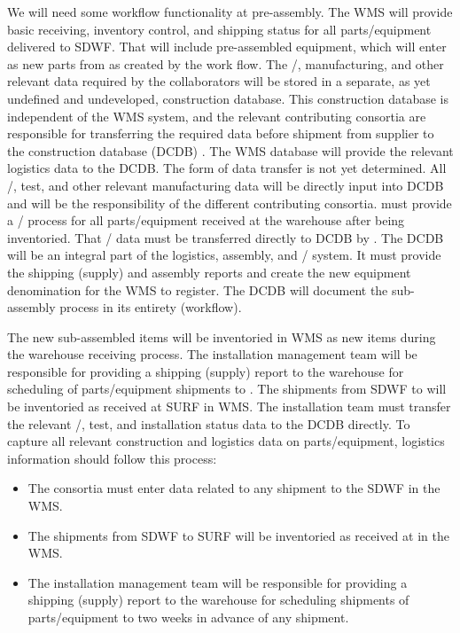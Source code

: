 We will need some workflow functionality at  pre-assembly.
The WMS will provide basic receiving, inventory control, and shipping status for all parts/equipment delivered to SDWF. That will include pre-assembled equipment, which will enter as new parts from  as created by the work flow.
The /, manufacturing, and other relevant data required by the  collaborators will be stored in a separate, as yet undefined and undeveloped,  construction database. 
This  construction database is independent of the WMS system, and the relevant contributing consortia are responsible for transferring the required data before shipment from supplier to the  construction database (DCDB) .  The WMS database will provide the relevant logistics data to the DCDB. The form of data transfer is not yet determined.
All /, test, and other relevant manufacturing data will be directly input into DCDB and will be the responsibility of the different contributing consortia.  must provide a / process for all parts/equipment received at the warehouse after being inventoried. That / data must be transferred directly to DCDB by . 
The DCDB will be an integral part of the logistics, assembly, and / system. It must provide the  shipping (supply) and assembly reports and create the new equipment denomination for the WMS to register.  The DCDB will document the  sub-assembly process in its entirety (workflow).

The new sub-assembled items will be inventoried in WMS as new items during the warehouse receiving process.
The  installation management team will be responsible for providing a shipping (supply) report to the warehouse for scheduling of parts/equipment shipments to .
The shipments from SDWF to  will be inventoried as received at SURF in WMS.
The  installation team must transfer the relevant /, test, and installation status data to the DCDB directly.
To capture all relevant construction and logistics data on parts/equipment, logistics information should follow this process:

\begin{itemize}
\item The consortia must enter data related to any shipment to the SDWF in the WMS.
\item The shipments from SDWF to SURF will be inventoried as received at  in the WMS.
\item The  installation management team will be responsible for providing a shipping (supply) report to the warehouse for scheduling shipments of parts/equipment to  two weeks in advance of any shipment.
\end{itemize}







